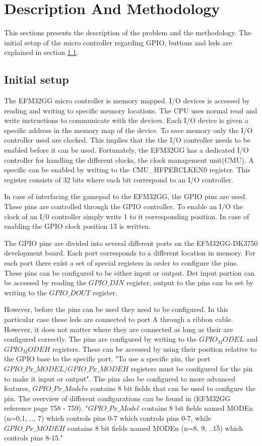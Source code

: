 \section{Description And Methodology}
This sections presents the description of the problem and the methodology. The initial setup of the micro controller regarding GPIO, buttons and leds are explained in section \ref{ch:initial_setup}. 


\subsection{Initial setup} \label{ch:initial_setup}
The EFM32GG micro controller is memory mapped. I/O devices is accessed by reading and writing to specific memory locations. The CPU uses normal read and write instructions to communicate with the devices. Each I/O device is given a specific address in the memory map of the device. To save memory only the I/O controller used are clocked. This implies that the the I/O controller needs to be enabled before it can be used. Fortunately, the EFM32GG has a dedicated I/O controller for handling the different clocks, the clock management unit(CMU). A specific can be enabled by writing to the \emph CMU\_HFPERCLKEN0 register. This register consists of 32 bits where each bit correspond to an I/O controller. 

In case of interfacing the gamepad to the EFM32GG, the GPIO pins are used. These pins are controlled through the GPIO controller. To enable an I/O the clock of an I/0 controller simply write 1 to it corresponding position. In case of enabling the GPIO clock position 13 is written. 

The GPIO pins are divided into several different ports on the EFM32GG-DK3750 development board. Each port corresponds to a different location in memory. For each port there exist a set of special registers in order to configure the pins. These pins can be configured to be either input or output. Det input portion can be accessed by reading the $GPIO\_DIN$ register, output to the pins can be set by writing to the $GPIO\_DOUT$ register. 

However, before the pins can be used they need to be configured. In this particular case these leds are connected to port A through a ribbon cable. However, it does not matter where they are connected as long as their are configured correctly. The pins are configured by writing to the $GPIO_MODEL$ and $GPIO_MODEH$ registers. These can be accessed by using their position relative to the GPIO base to the specific port. "To use a specific pin, the port $GPIO\_Px\_MODEL/GPIO\_Px\_MODEH$ registers must be configured for the pin to make it input or output". The pins also be configured to more advanced features, $GPIO\_Px\_Modeln$ contains 8 bit fields that can be used to configure the pin. The overview of different configurations can be found in (EFM32GG reference page 758 - 759). "$GPIO\_Px\_Model$ contains 8 bit fields named MODEn (n=0,1, .., 7) which controls pins 0-7 which controls pins 0-7, while $GPIO\_Px\_MODEH$ contains 8 bit fields named MODEn (n=8, 9, ..15) which controls pins 8-15."  

